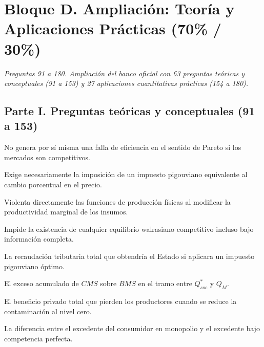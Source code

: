 \section*{Bloque D. Ampliación: Teoría y Aplicaciones Prácticas (70\% / 30\%)}

\noindent\textit{Preguntas 91 a 180. Ampliación del banco oficial con 63 preguntas teóricas y conceptuales (91 a 153) y 27 aplicaciones cuantitativas prácticas (154 a 180).}

\subsection*{Parte I. Preguntas teóricas y conceptuales (91 a 153)}

\begin{opts}
    \item No genera por sí misma una falla de eficiencia en el sentido de Pareto si los mercados son competitivos.
    \item Exige necesariamente la imposición de un impuesto pigouviano equivalente al cambio porcentual en el precio.
    \item Violenta directamente las funciones de producción físicas al modificar la productividad marginal de los insumos.
    \item Impide la existencia de cualquier equilibrio walrasiano competitivo incluso bajo información completa.
\end{opts}

\begin{opts}
    \item La recaudación tributaria total que obtendría el Estado si aplicara un impuesto pigouviano óptimo.
    \item El exceso acumulado de $CMS$ sobre $BMS$ en el tramo entre $Q_{soc}^*$ y $Q_M$.
    \item El beneficio privado total que pierden los productores cuando se reduce la contaminación al nivel cero.
    \item La diferencia entre el excedente del consumidor en monopolio y el excedente bajo competencia perfecta.
\end{opts}

